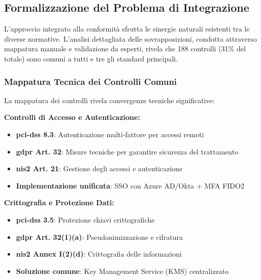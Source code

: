 \subsection{\texorpdfstring{Formalizzazione del Problema di Integrazione}{4.3.1 - Formalizzazione del Problema di Integrazione}}

L'approccio integrato alla conformità sfrutta le sinergie naturali esistenti tra le diverse normative. L'analisi dettagliata delle sovrapposizioni, condotta attraverso mappatura manuale e validazione da esperti, rivela che 188 controlli (31\% del totale) sono comuni a tutti e tre gli standard principali.

\subsubsection{\texorpdfstring{Mappatura Tecnica dei Controlli Comuni}{4.3.1.1 - Mappatura Tecnica dei Controlli Comuni}}

La mappatura dei controlli rivela convergenze tecniche significative:

\textbf{Controlli di Accesso e Autenticazione:}
\begin{itemize}
    \item \textbf{\gls{pci-dss} 8.3}: Autenticazione multi-fattore per accessi remoti
    \item \textbf{\gls{gdpr} Art. 32}: Misure tecniche per garantire sicurezza del trattamento
    \item \textbf{\gls{nis2} Art. 21}: Gestione degli accessi e autenticazione
    \item \textbf{Implementazione unificata}: SSO con Azure AD/Okta + MFA FIDO2
\end{itemize}

\textbf{Crittografia e Protezione Dati:}
\begin{itemize}
    \item \textbf{\gls{pci-dss} 3.5}: Protezione chiavi crittografiche
    \item \textbf{\gls{gdpr} Art. 32(1)(a)}: Pseudonimizzazione e cifratura
    \item \textbf{\gls{nis2} Annex I(2)(d)}: Crittografia delle informazioni
    \item \textbf{Soluzione comune}: Key Management Service (KMS) centralizzato
\end{itemize}

